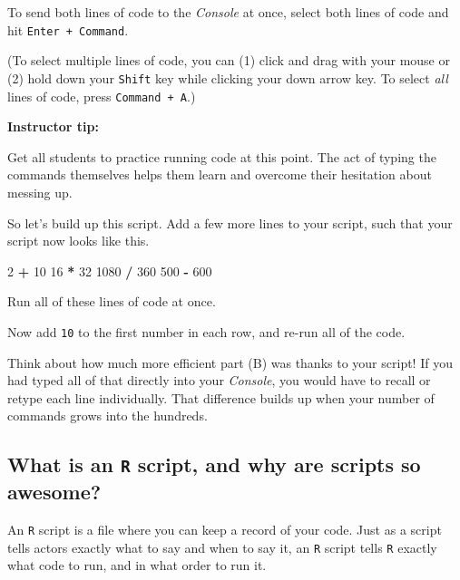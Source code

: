 \documentclass[
]{book}
\newenvironment{Shaded}{\begin{snugshade}}{\end{snugshade}}
\newcommand{\DecValTok}[1]{\textcolor[rgb]{0.00,0.00,0.81}{#1}}
\newcommand{\OperatorTok}[1]{\textcolor[rgb]{0.81,0.36,0.00}{\textbf{#1}}}
\newcommand{\StringTok}[1]{\textcolor[rgb]{0.31,0.60,0.02}{#1}}
\begin{document}
To send both lines of code to the \emph{Console} at once, select both lines of code and hit \texttt{Enter\ +\ Command}.

(To select multiple lines of code, you can (1) click and drag with your mouse or (2) hold down your \texttt{Shift} key while clicking your down arrow key. To select \emph{all} lines of code, press \texttt{Command\ +\ A}.)

\leavevmode\hypertarget{tip-text}{}%
\textbf{Instructor tip:}

Get all students to practice running code at this point. The act of typing the commands themselves helps them learn and overcome their hesitation about messing up.

So let's build up this script. Add a few more lines to your script, such that your script now looks like this.

\begin{Shaded}
\begin{Highlighting}[]
\DecValTok{2}  \OperatorTok{+}\StringTok{ }\DecValTok{10}
\DecValTok{16} \OperatorTok{*}\StringTok{ }\DecValTok{32}
\DecValTok{1080} \OperatorTok{/}\StringTok{ }\DecValTok{360}
\DecValTok{500} \OperatorTok{-}\StringTok{ }\DecValTok{600}
\end{Highlighting}
\end{Shaded}

Run all of these lines of code at once.

Now add \texttt{10} to the first number in each row, and re-run all of the code.

Think about how much more efficient part (B) was thanks to your script! If you had typed all of that directly into your \emph{Console}, you would have to recall or retype each line individually. That difference builds up when your number of commands grows into the hundreds.

\hypertarget{what-is-an-r-script-and-why-are-scripts-so-awesome}{%
\subsection*{\texorpdfstring{What is an \texttt{R} script, and why are scripts so awesome?}{What is an R script, and why are scripts so awesome?}}\label{what-is-an-r-script-and-why-are-scripts-so-awesome}}

An \texttt{R} script is a file where you can keep a record of your code. Just as a script tells actors exactly what to say and when to say it, an \texttt{R} script tells \texttt{R} exactly what code to run, and in what order to run it.
\end{document}

